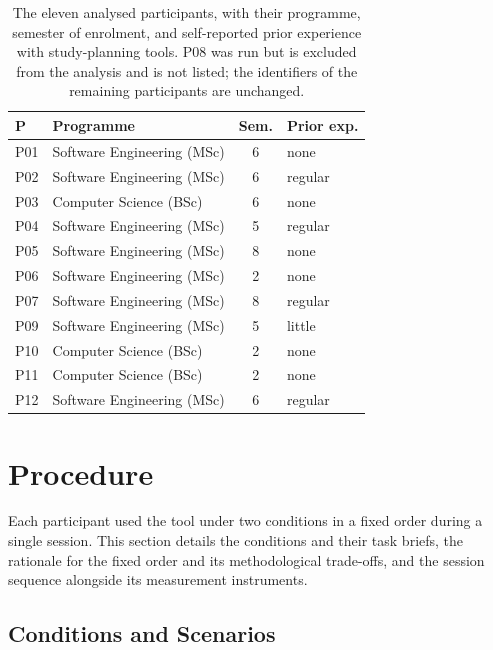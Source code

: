 \begin{table}[htpb]
    \centering
    \small
    \begin{tabular}{llcl}
        \toprule
        P & Programme & Sem. & Prior exp. \\
        \midrule
        P01 & Software Engineering (MSc) & 6 & none    \\
        P02 & Software Engineering (MSc) & 6 & regular \\
        P03 & Computer Science (BSc)     & 6 & none    \\
        P04 & Software Engineering (MSc) & 5 & regular \\
        P05 & Software Engineering (MSc) & 8 & none    \\
        P06 & Software Engineering (MSc) & 2 & none    \\
        P07 & Software Engineering (MSc) & 8 & regular \\
        P09 & Software Engineering (MSc) & 5 & little  \\
        P10 & Computer Science (BSc)     & 2 & none    \\
        P11 & Computer Science (BSc)     & 2 & none    \\
        P12 & Software Engineering (MSc) & 6 & regular \\
        \bottomrule
    \end{tabular}
    \caption{The eleven analysed participants, with their programme, semester of enrolment, and self-reported prior experience with study-planning tools. P08 was run but is excluded from the analysis and is not listed; the identifiers of the remaining participants are unchanged.}
    \label{tab:participants}
\end{table}

\section{Procedure}
\label{sec:eval-procedure}

Each participant used the tool under two conditions in a fixed order during a single session. This section details the conditions and their task briefs, the rationale for the fixed order and its methodological trade-offs, and the session sequence alongside its measurement instruments.

\subsection{Conditions and Scenarios}
\label{sec:eval-conditions}

